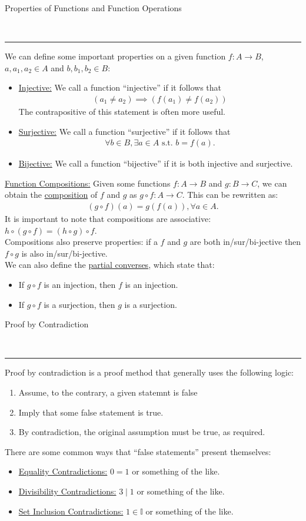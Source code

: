 \documentclass{article}
\newcommand{\suchthat}{\textrm{ s.t. }}
\newcommand{\header}[1]{\begin{large}\noindent #1\end{large}\\\rule{\textwidth}{0.5pt}}
\newcommand{\gap}{\medskip\\}
\newcommand{\sheader}[1]{\underline{#1:}}
\begin{document}
\header{Properties of Functions and Function Operations}
We can define some important properties on a given function $f: A \to B$, $a, a_1, a_2 \in A$ and $b, b_1, b_2 \in B$:
\begin{itemize}
    \item \sheader{Injective} We call a function ``injective'' if it follows that 
    \begin{align*}
        (a_1 \neq a_2) \implies (f(a_1) \neq f(a_2))
    \end{align*}
    The contrapositive of this statement is often more useful.
    \item \sheader{Surjective} We call a function ``surjective'' if it follows that 
    \begin{align*}
        \forall b \in B, \exists a \in A \suchthat b = f(a).
    \end{align*}
    \item \sheader{Bijective} We call a function ``bijective'' if it is both 
    injective and surjective. 
\end{itemize}

\sheader{Function Compositions} Given some functions $f: A \to B$ and $g: B \to C$,
we can obtain the \underline{composition} of $f$ and $g$ as $g \circ f: A \to C$.
This can be rewritten as:
\begin{align*}
    (g \circ f)(a) = g(f(a)), \forall a \in A.
\end{align*}
It is important to note that compositions are associative: $h\circ (g\circ f) = (h \circ g) \circ f$.
\gap
Compositions also preserve properties: if a $f$ and $g$ are both in/sur/bi-jective then
$f \circ g$ is also in/sur/bi-jective. 
\gap
We can also define the \underline{partial converses}, which state that:
\begin{itemize}
    \item If $g \circ f$ is an injection, then $f$ is an injection.
    \item If $g \circ f$ is a surjection, then $g$ is a surjection.
\end{itemize}

\header{Proof by Contradiction}
Proof by contradiction is a proof method that generally uses the following logic:
\begin{enumerate}
    \item Assume, to the contrary, a given statemnt is false
    \item Imply that some false statement is true.
    \item By contradiction, the original assumption must be true, as required.
\end{enumerate}
There are some common ways that ``false statements'' present themselves:
\begin{itemize}
    \item \sheader{Equality Contradictions} $0 = 1$ or something of the like.
    \item \sheader{Divisibility Contradictions} $3 \mid 1$ or something of the like.
    \item \sheader{Set Inclusion Contradictions} $1 \in \mathbb{I}$ or something of the like.
\end{itemize}
\end{document}
